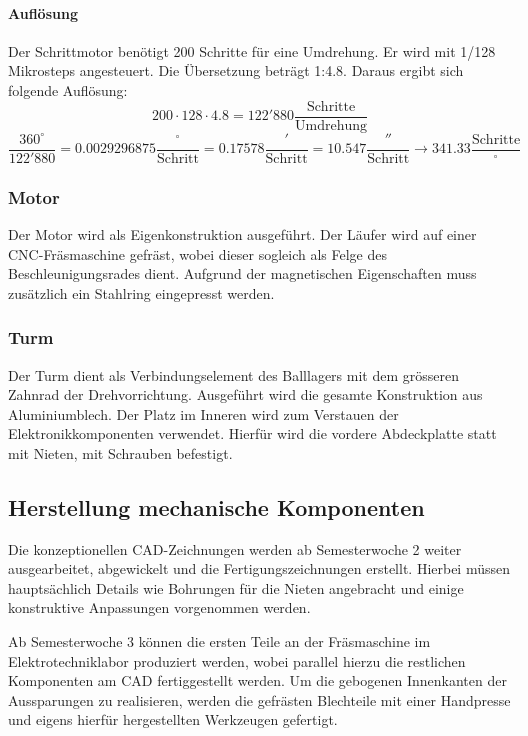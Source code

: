 \paragraph{Auflösung}
Der Schrittmotor benötigt 200 Schritte für eine Umdrehung. Er wird mit 1/128 
Mikrosteps angesteuert. Die Übersetzung beträgt 1:4.8. Daraus ergibt sich 
folgende Auflösung: 
\[ 200 \cdot 128 \cdot 4.8 = 122'880 \frac{\text{Schritte}}{\text{Umdrehung}}  \]
\[ \frac{360^\circ}{122'880} = 0.0029296875 \frac{^\circ}{\text{Schritt}} 
= 0.17578 \frac{'}{\text{Schritt}} = 10.547 \frac{''}{\text{Schritt}}
\rightarrow 341.33 \frac{\text{Schritte}}{^\circ}\]

\subsubsection{Motor}
Der Motor wird als Eigenkonstruktion ausgeführt. Der Läufer wird auf einer CNC-Fräsmaschine gefräst, wobei dieser sogleich als Felge des 
Beschleunigungsrades dient. Aufgrund der magnetischen Eigenschaften muss zusätzlich ein Stahlring eingepresst werden.

\subsubsection{Turm}
Der Turm dient als Verbindungselement des Balllagers mit dem grösseren 
Zahnrad der Drehvorrichtung. Ausgeführt wird die gesamte Konstruktion aus Aluminiumblech. Der Platz im Inneren wird zum Verstauen der 
Elektronikkomponenten verwendet. Hierfür wird die vordere Abdeckplatte statt mit Nieten, mit Schrauben befestigt.

\clearpage
\subsection{Herstellung mechanische Komponenten}
Die konzeptionellen CAD-Zeichnungen werden ab Semesterwoche 2 weiter ausgearbeitet, abgewickelt und die Fertigungszeichnungen erstellt. Hierbei müssen hauptsächlich Details wie Bohrungen für die Nieten angebracht und einige konstruktive Anpassungen vorgenommen werden. 

Ab Semesterwoche 3 können die ersten Teile an der Fräsmaschine im Elektrotechniklabor produziert werden, wobei parallel  hierzu die restlichen Komponenten am CAD fertiggestellt werden.
Um die gebogenen Innenkanten der Aussparungen zu realisieren, werden die gefrästen Blechteile mit einer Handpresse und eigens hierfür hergestellten Werkzeugen gefertigt.

